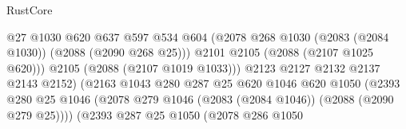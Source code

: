 \begin{lexlean}{RustCore}
\begin{coremodule}
                                                @27
                                                @1030
                                                @620
                                                @637
                                                @597
                                                @534
                                                @604
                                                (@2078
                                                  @268
                                                  @1030
                                                  (@2083 (@2084 @1030))
                                                  (@2088 (@2090 @268 @25)))
                                                @2101
                                                @2105
                                                (@2088 (@2107 @1025 @620)))
                                              @2105
                                              (@2088 (@2107 @1019 @1033)))
                                            @2123
                                            @2127
                                            @2132
                                            @2137
                                            @2143
                                            @2152)
                                          (@2163
                                            @1043
                                            @280
                                            @287
                                            @25
                                            @620
                                            @1046
                                            @620
                                            @1050
                                            (@2393
                                              @280
                                              @25
                                              @1046
                                              (@2078
                                                @279
                                                @1046
                                                (@2083 (@2084 @1046))
                                                (@2088 (@2090 @279 @25))))
                                            (@2393
                                              @287
                                              @25
                                              @1050
                                              (@2078
                                                @286
                                                @1050

\end{coremodule}
\end{lexlean}

